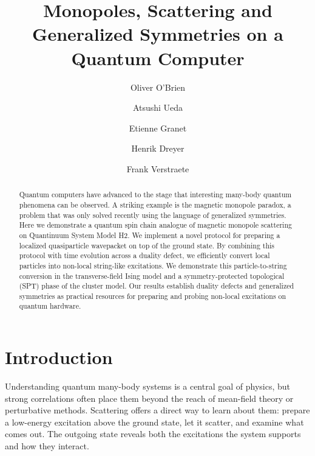 \documentclass[aps,floatfix,10pt,amssymb,amsfont,amsmath,superscriptaddress,float,nofootinbib,longbibliography,nobalancelastpage,twocolumn]{revtex4-2}
\begin{document}

\author{Oliver O'Brien}
\author{Atsushi Ueda}
\author{Etienne Granet}
\author{Henrik Dreyer}
\author{Frank Verstraete}


\title{Monopoles, Scattering and Generalized Symmetries on a Quantum Computer}
\begin{abstract}
Quantum computers have advanced to the stage that interesting many-body quantum phenomena can be observed. A striking example is the magnetic monopole paradox, a problem that was only solved recently using the language of generalized symmetries. Here we demonstrate a quantum spin chain analogue of magnetic monopole scattering \cite{ueda2025} on Quantinuum System Model H2. We implement a novel protocol for preparing a localized quasiparticle wavepacket on top of the ground state. By combining this protocol with time evolution across a duality defect, we efficiently convert local particles into non-local string-like excitations. We demonstrate this particle-to-string conversion in the transverse-field Ising model and a symmetry-protected topological (SPT) phase of the cluster model. Our results establish duality defects and generalized symmetries as practical resources for preparing and probing non-local excitations on quantum hardware.
\end{abstract}

\maketitle

\section{Introduction}
Understanding quantum many-body systems is a central goal of physics, but strong correlations often place them beyond the reach of mean-field theory or perturbative methods. Scattering offers a direct way to learn about them: prepare a low-energy excitation above the ground state, let it scatter, and examine what comes out. The outgoing state reveals both the excitations the system supports and how they interact.
\end{document}
